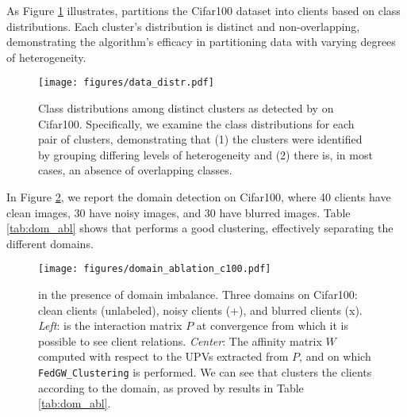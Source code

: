 As Figure \ref{fig:class_distr} illustrates, \shortname partitions the Cifar100 dataset into clients based on class distributions. Each cluster's distribution is distinct and non-overlapping, demonstrating the algorithm's efficacy in partitioning data with varying degrees of heterogeneity.
\begin{figure}[t]
    \centering
    \texttt{[image: figures/data\_distr.pdf]}
    \caption{\small{Class distributions among distinct clusters as detected by \shortname on Cifar100. Specifically, we examine the class distributions for each pair of clusters, demonstrating that (1) the clusters were identified by grouping differing levels of heterogeneity and (2) there is, in most cases, an absence of overlapping classes.}}
    \label{fig:class_distr}
\end{figure}
In Figure \ref{fig:dom_ablation}, we report the domain detection on Cifar100, where 40 clients have clean images, 30 have noisy images, and 30 have blurred images. Table \ref{tab:dom_abl} shows that \shortname performs a good clustering, effectively separating the different domains.
\begin{figure}
    \centering
     
    \texttt{[image: figures/domain\_ablation\_c100.pdf]}
    \caption{\small{\shortname in the presence of domain imbalance. Three domains on Cifar100: clean clients (unlabeled), noisy clients (+), and blurred clients (x). \textit{Left}: is the interaction matrix $P$ at convergence from which it is possible to see client relations. \textit{Center}: The affinity matrix $W$ computed with respect to the UPVs extracted from $P$, and on which \texttt{FedGW\_Clustering} is performed. We can see that \shortname clusters the clients according to the domain, as proved by results in Table \ref{tab:dom_abl}.}}
    \label{fig:dom_ablation}
   
\end{figure}
